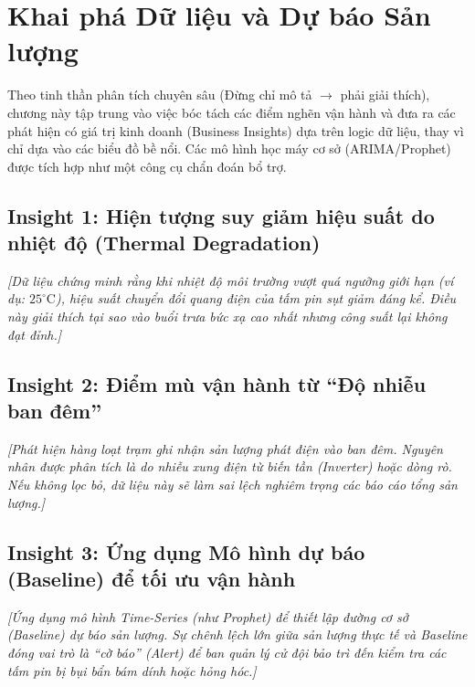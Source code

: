 \documentclass[12pt, a4paper]{report}
\begin{document}
\chapter{Khai phá Dữ liệu và Dự báo Sản lượng}
\label{chap:insights}

Theo tinh thần phân tích chuyên sâu (Đừng chỉ mô tả $\rightarrow$ phải giải thích), chương này tập trung vào việc bóc tách các điểm nghẽn vận hành và đưa ra các phát hiện có giá trị kinh doanh (Business Insights) dựa trên logic dữ liệu, thay vì chỉ dựa vào các biểu đồ bề nổi. Các mô hình học máy cơ sở (ARIMA/Prophet) được tích hợp như một công cụ chẩn đoán bổ trợ.

\section{Insight 1: Hiện tượng suy giảm hiệu suất do nhiệt độ (Thermal Degradation)}
\textit{[Dữ liệu chứng minh rằng khi nhiệt độ môi trường vượt quá ngưỡng giới hạn (ví dụ: $25^\circ\text{C}$), hiệu suất chuyển đổi quang điện của tấm pin sụt giảm đáng kể. Điều này giải thích tại sao vào buổi trưa bức xạ cao nhất nhưng công suất lại không đạt đỉnh.]}

\section{Insight 2: Điểm mù vận hành từ ``Độ nhiễu ban đêm''}
\textit{[Phát hiện hàng loạt trạm ghi nhận sản lượng phát điện vào ban đêm. Nguyên nhân được phân tích là do nhiễu xung điện từ biến tần (Inverter) hoặc dòng rò. Nếu không lọc bỏ, dữ liệu này sẽ làm sai lệch nghiêm trọng các báo cáo tổng sản lượng.]}

\section{Insight 3: Ứng dụng Mô hình dự báo (Baseline) để tối ưu vận hành}
\textit{[Ứng dụng mô hình Time-Series (như Prophet) để thiết lập đường cơ sở (Baseline) dự báo sản lượng. Sự chênh lệch lớn giữa sản lượng thực tế và Baseline đóng vai trò là ``cờ báo'' (Alert) để ban quản lý cử đội bảo trì đến kiểm tra các tấm pin bị bụi bẩn bám dính hoặc hỏng hóc.]}


\end{document}
